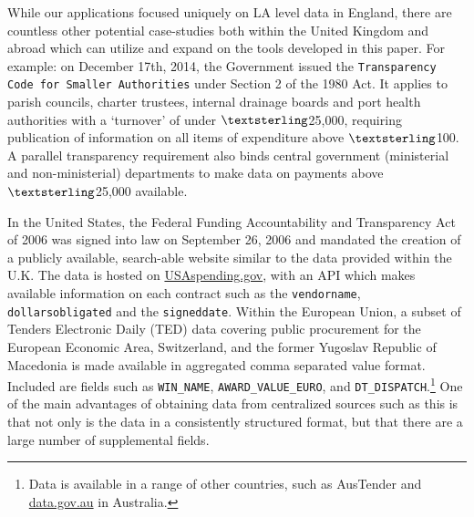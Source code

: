 \documentclass[12pt]{article}
\begin{document}
While our applications focused uniquely on LA level data in England, there are countless other potential case-studies both within the United Kingdom and abroad which can utilize and expand on the tools developed in this paper. For example: on December 17th, 2014, the Government issued the \texttt{Transparency Code for Smaller Authorities} under Section 2 of the 1980 Act. It applies to parish councils, charter trustees, internal drainage boards and port health authorities with a `turnover’ of under $\textsterling$25,000, requiring publication of information on all items of expenditure above $\textsterling$100. A parallel transparency requirement also binds central government (ministerial and non-ministerial) departments to make data on payments above $\textsterling$25,000 available.

In the United States, the Federal Funding Accountability and Transparency Act of 2006 was signed into law on September 26, 2006 and mandated the creation of a publicly available, search-able website similar to the data provided within the U.K. The data is hosted on \url{USAspending.gov}, with an API which makes available information on each contract such as the \texttt{vendorname}, \texttt{dollarsobligated} and the \texttt{signeddate}. Within the European Union, a subset of Tenders Electronic Daily (TED) data covering public procurement for the European Economic Area, Switzerland, and the former Yugoslav Republic of Macedonia is made available in aggregated comma separated value format. Included are fields such as \texttt{WIN\_NAME}, \texttt{AWARD\_VALUE\_EURO}, and \texttt{DT\_DISPATCH}.\footnote{Data is available in a range of other countries, such as AusTender and \url{data.gov.au} in Australia.} One of the main advantages of obtaining data from centralized sources such as this is that not only is the data in a consistently structured format, but that there are a large number of supplemental fields.
\end{document}
